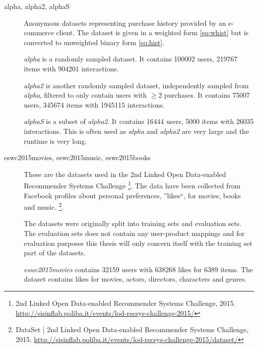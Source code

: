 \begin{description}
    \item[alpha, alpha2, alphaS] \hfill

        Anonymous datasets representing purchase history provided by an e-commerce client. The dataset is given in a weighted form \eqref{eq:whist} but is converted to unweighted binary form \eqref{eq:hist}.

        \textit{alpha} is a randomly sampled dataset. It contains 100002 users, 219767 items with 904201 interactions.

        \textit{alpha2} is another randomly sampled dataset, independently sampled from \textit{alpha}, filtered to only contain users with $\geq 2$ purchases. It contains 75007 users, 345674 items with 1945115 interactions.

        \textit{alphaS} is a subset of \textit{alpha2}. It contains 16444 users, 5000 items with 26035 interactions. This is often used as \textit{alpha} and \textit{alpha2} are very large and the runtime is very long.




    \item[eswc2015movies, eswc2015music, eswc2015books] \hfill

        These are the datasets used in the 2nd Linked Open Data-enabled Recommender Systems Challenge
        \footnote{2nd Linked Open Data-enabled Recommender Systems Challenge, 2015. \url{http://sisinflab.poliba.it/events/lod-recsys-challenge-2015/}}.
        The data have been collected from Facebook profiles about personal preferences, ''likes``, for movies, books and music.
        \footnote{DataSet | 2nd Linked Open Data-enabled Recommender Systems Challenge, 2015. \url{http://sisinflab.poliba.it/events/lod-recsys-challenge-2015/dataset/}}.

        The datasets were originally split into training sets and evaluation sets. The evaluation sets does not contain any user-product mappings and for evaluation purposes this thesis will only concern itself with the training set part of the datasets.

        \textit{eswc2015movies} contains 32159 users with 638268 likes for 6389 items. The dataset contains likes for movies, actors, directors, characters and genres.


\end{description}
